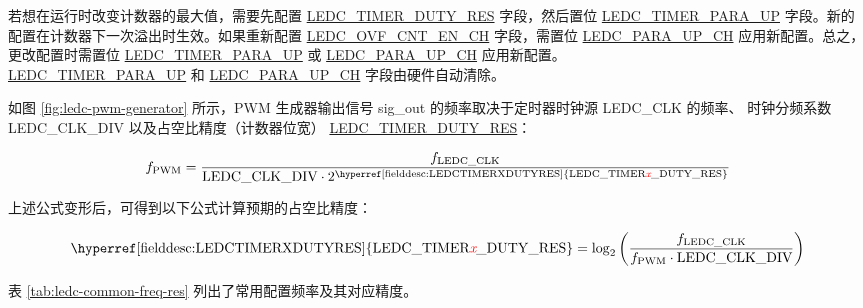 \documentclass[main\_\_CN.tex]{subfiles}
\begin{document}
若想在运行时改变计数器的最大值，需要先配置 \hyperref[fielddesc:LEDCTIMERXDUTYRES]{LEDC\_TIMER\_DUTY\_RES} 字段，然后置位 \hyperref[fielddesc:LEDCTIMERXPARAUP]{LEDC\_TIMER\_PARA\_UP} 字段。新的配置在计数器下一次溢出时生效。如果重新配置 \hyperref[fielddesc:LEDCOVFCNTENCHN]{LEDC\_OVF\_CNT\_EN\_CH} 字段，需置位 \hyperref[fielddesc:LEDCPARAUPCHN]{LEDC\_PARA\_UP\_CH} 应用新配置。总之，更改配置时需置位 \hyperref[fielddesc:LEDCTIMERXPARAUP]{LEDC\_TIMER\_PARA\_UP} 或 \hyperref[fielddesc:LEDCPARAUPCHN]{LEDC\_PARA\_UP\_CH} 应用新配置。\\\hyperref[fielddesc:LEDCTIMERXPARAUP]{LEDC\_TIMER\_PARA\_UP} 和 \hyperref[fielddesc:LEDCPARAUPCHN]{LEDC\_PARA\_UP\_CH} 字段由硬件自动清除。

如图 \ref{fig:ledc-pwm-generator} 所示，PWM 生成器输出信号 sig\_out 的频率取决于定时器时钟源 LEDC\_CLK 的频率、 时钟分频系数 LEDC\_CLK\_DIV 以及占空比精度（计数器位宽） \hyperref[fielddesc:LEDCTIMERXDUTYRES]{LEDC\_TIMER\_DUTY\_RES}：

    \[
    f_{\textrm{PWM}}=\frac{f_{\textrm{LEDC\_CLK}}}
                        {\textrm{LEDC\_CLK\_DIV}\cdot 2^{\textrm{\hyperref[fielddesc:LEDCTIMERXDUTYRES]{LEDC\_TIMER\regindex{x}\_DUTY\_RES}}}}
    \]

上述公式变形后，可得到以下公式计算预期的占空比精度：

    \[
    \textrm{\hyperref[fielddesc:LEDCTIMERXDUTYRES]{LEDC\_TIMER\regindex{x}\_DUTY\_RES}}
    =\log_2\left(\frac{f_{\textrm{LEDC\_CLK}}}
    {f_{\textrm{PWM}}\cdot \textrm{LEDC\_CLK\_DIV}}\right)
    \]


表 \ref{tab:ledc-common-freq-res} 列出了常用配置频率及其对应精度。
\end{document}
